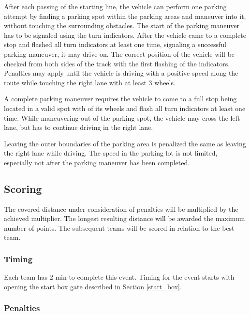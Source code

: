 After each passing of the starting line, the vehicle can perform one parking
attempt by finding a  parking spot within the parking areas and maneuver into
it, without touching the surrounding obstacles. The start of the parking
maneuver has to be signaled using the turn indicators. After the vehicle came
to a complete stop and flashed all turn indicators at least one time, signaling
a successful parking maneuver, it may drive on. The correct position of the
vehicle will be checked from both sides of the track with the first flashing of
the indicators. Penalties may apply until the vehicle is driving with a
positive speed along the route while touching the right lane with at least 3
wheels.

A complete parking maneuver requires the vehicle to come to a full stop being
located in a valid spot with  of its wheels and flash all turn
indicators at least one time. While maneuvering out of the parking spot, the
vehicle may cross the left lane, but has to continue driving in the right lane.

Leaving the outer boundaries of the parking area is penalized the same as
leaving the right lane while driving. The speed in the parking lot is not
limited, especially not after the parking maneuver has been completed.

\subsection{Scoring}
\label{freedrive_scoring}

The covered distance under consideration of penalties will be multiplied by the
achieved multiplier. The longest resulting distance will be awarded the maximum
number of points. The subsequent teams will be scored in relation to the best
team.

\subsubsection{Timing}

Each team has 2 min to complete this event. Timing for the event starts with
opening the start box gate described in Section \ref{start_box}.

\subsubsection{Penalties}
\label{freedrive_penalties}

